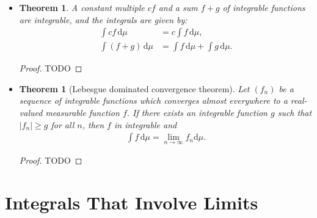 \documentclass[10pt]{article}
\newtheorem{theorem}[lemma]{Theorem}
\newcommand{\dee}{\mathrm{d}}
\begin{document}
\begin{itemize}
  \begin{proof}
    First, we have that $|f| \in M^+$, so $\int |f|\, \dee\mu$ is well defined. Moreover, we know that it has a finite value because we can apply Lemma~\ref{lemma:integral-is-monotone} to $|f|$ and $|g|$ to conclude that $\int |f|\,\dee\mu \leq \int |g|\,\dee\mu$. Now, we can apply Theorem~\ref{theorem:absolute-integrability} to conclude that $f$ is also integrable.
  \end{proof}

  \item \begin{theorem}
    A constant multiple $cf$ and a sum $f+g$ of integrable functions are integrable, and the integrals are given by:
    \begin{align*}
      \int cf\, \dee\mu &= c \int f\,\dee\mu,\\
      \int (f+g)\, \dee\mu &= \int f\,\dee\mu + \int g\,\dee\mu.
    \end{align*}
  \end{theorem}

  \begin{proof}
    TODO
  \end{proof}

  \item \begin{theorem}[Lebesgue dominated convergence theorem]
    Let $(f_n)$ be a sequence of integrable functions which converges almost everywhere to a real-valued measurable function $f$. If there exists an integrable function $g$ such that $|f_n| \geq g$  for all $n$, then $f$ in integrable and
    \begin{align*}
      \int f\,\dee\mu = \lim_{n\rightarrow \infty} f_n \dee\mu.
    \end{align*}
  \end{theorem}

  \begin{proof}
    TODO
  \end{proof}  
\end{itemize}

\section{Integrals That Involve Limits}
\end{document}

